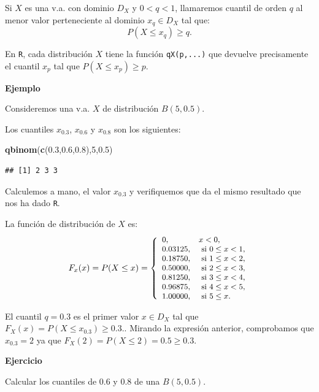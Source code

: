 \documentclass[]{book}
\newenvironment{Shaded}{\begin{snugshade}}{\end{snugshade}}
\newcommand{\DecValTok}[1]{\textcolor[rgb]{0.00,0.00,0.81}{#1}}
\newcommand{\FloatTok}[1]{\textcolor[rgb]{0.00,0.00,0.81}{#1}}
\newcommand{\KeywordTok}[1]{\textcolor[rgb]{0.13,0.29,0.53}{\textbf{#1}}}
\newcommand{\NormalTok}[1]{#1}
\begin{document}
Si \(X\) es una v.a. con dominio \(D_X\) y \(0<q<1\), llamaremos cuantil de orden \(q\) al menor valor perteneciente al dominio \(x_q\in D_X\) tal que:
\[P(X\leq x_q)\geq q.\]

En \texttt{R}, cada distribución \(X\) tiene la función \texttt{qX(p,...)} que devuelve precisamente el cuantil \(x_p\) tal que \(P(X\leq x_p)\geq p.\)

\textbf{Ejemplo}

Consideremos una v.a. \(X\) de distribución \(B(5,0.5)\).

Los cuantiles \(x_{0.3}\), \(x_{0.6}\) y \(x_{0.8}\) son los siguientes:

\begin{Shaded}
\begin{Highlighting}[]
\KeywordTok{qbinom}\NormalTok{(}\KeywordTok{c}\NormalTok{(}\FloatTok{0.3}\NormalTok{,}\FloatTok{0.6}\NormalTok{,}\FloatTok{0.8}\NormalTok{),}\DecValTok{5}\NormalTok{,}\FloatTok{0.5}\NormalTok{)}
\end{Highlighting}
\end{Shaded}

\begin{verbatim}
## [1] 2 3 3
\end{verbatim}

Calculemos a mano, el valor \(x_{0.3}\) y verifiquemos que da el mismo resultado que nos ha dado \texttt{R}.

La función de distribución de \(X\) es:
\[
\small{
F_x(x)=P(X\leq x)=
\left\{
\begin{array}{ll}
0, & x< 0, \\
0.03125, & \mbox{ si } 0 \leq x< 1, \\
0.18750, & \mbox{ si } 1 \leq x< 2, \\
0.50000, & \mbox{ si } 2 \leq x< 3, \\
0.81250, & \mbox{ si } 3 \leq x< 4, \\
0.96875, & \mbox{ si } 4 \leq x< 5, \\
1.00000, & \mbox{ si }  5\leq x. \\
\end{array}
\right.}
\]

El cuantil \(q=0.3\) es el primer valor \(x\in D_X\) tal que \(F_X(x)=P(X\leq x_{0.3})\geq 0.3.\). Mirando la expresión anterior, comprobamos que \(x_{0.3}=2\) ya que \(F_X(2)=P(X\leq 2)=0.5 \geq 0.3\).

\textbf{Ejercicio}

Calcular los cuantiles de \(0.6\) y \(0.8\) de una \(B(5,0.5).\)
\end{document}
